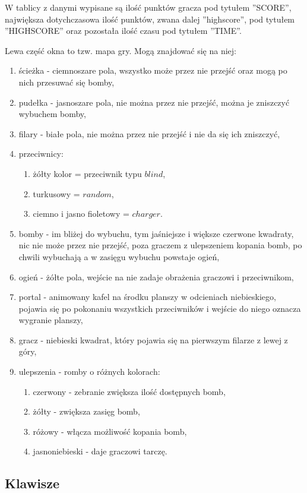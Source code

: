 \documentclass[12pt,a4paper]{article}
\begin{document}
W tablicy z danymi wypisane są ilość punktów gracza pod tytułem ''SCORE'', największa dotychczasowa ilość punktów, zwana dalej ''highscore'', pod tytułem ''HIGHSCORE'' oraz pozostała ilość czasu pod tytułem ''TIME''. 

Lewa część okna to tzw. mapa gry. Mogą znajdować się na niej:
\begin{enumerate}
 \item ścieżka - ciemnoszare pola, wszystko może przez nie przejść oraz mogą po nich przesuwać się bomby,
 \item pudełka - jasnoszare pola, nie można przez nie przejść, można je zniszczyć wybuchem bomby,
 \item filary - białe pola, nie można przez nie przejść i nie da się ich zniszczyć,
 \item przeciwnicy:
\begin{enumerate}
\item żółty kolor = przeciwnik typu $blind$,
\item turkusowy = $random$,
\item ciemno i jasno fioletowy = $charger$.
\end{enumerate}
 \item bomby - im bliżej do wybuchu, tym jaśniejsze i większe czerwone kwadraty, nic nie może przez nie przejść, poza graczem z ulepszeniem kopania bomb, po chwili wybuchają a w zasięgu wybuchu powstaje ogień,
 \item ogień - żółte pola, wejście na nie zadaje obrażenia graczowi i przeciwnikom,
 \item portal - animowany kafel na środku planszy w odcieniach niebieskiego, pojawia się po pokonaniu wszystkich przeciwników i wejście do niego oznacza wygranie planszy,
 \item gracz - niebieski kwadrat, który pojawia się na pierwszym filarze z lewej z góry,
 \item ulepszenia - romby o różnych kolorach: 
\begin{enumerate}
 \item czerwony - zebranie zwiększa ilość dostępnych bomb,
\item żółty - zwiększa zasięg bomb,
\item różowy - włącza możliwość kopania bomb,
\item jasnoniebieski - daje graczowi tarczę.
\end{enumerate}
\end{enumerate}

\subsection{Klawisze}  
\end{document}
